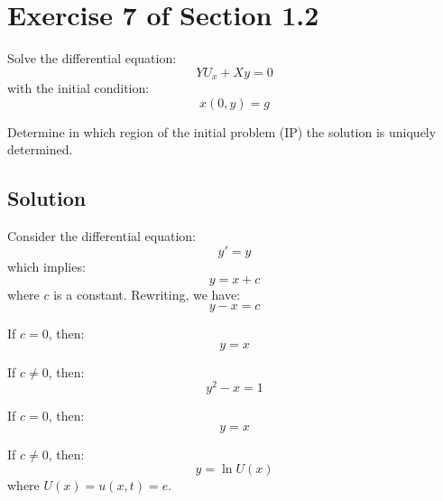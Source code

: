 \documentclass[11pt]{article}
\begin{document}




\section*{Exercise 7 of Section 1.2}

Solve the differential equation:
\begin{equation}
    Y U_x + X y = 0
\end{equation}
with the initial condition:
\begin{equation}
    x(0, y) = g
\end{equation}

Determine in which region of the initial problem (IP) the solution is uniquely determined.

\subsection*{Solution}

Consider the differential equation:
\begin{equation}
    y' = y
\end{equation}
which implies:
\begin{equation}
    y = x + c
\end{equation}
where \( c \) is a constant. Rewriting, we have:
\begin{equation}
    y - x = c
\end{equation}

If \( c = 0 \), then:
\begin{equation}
    y = x
\end{equation}

If \( c \neq 0 \), then:
\begin{equation}
    y^2 - x = 1
\end{equation}

If \( c = 0 \), then:
\begin{equation}
    y = x
\end{equation}

If \( c \neq 0 \), then:
\begin{equation}
    y = \ln U(x)
\end{equation}
where \( U(x) = u(x, t) = e \).

\end{document}
